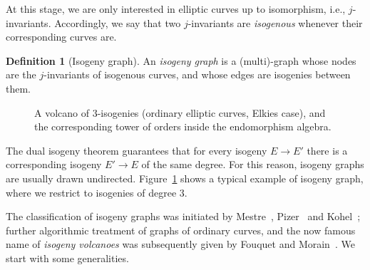 \documentclass[10pt]{article}
\theoremstyle{plain}
\theoremstyle{definition}
\newtheorem{definition}[theorem]{Definition}
\DeclareMathOperator{\End}{End} %
\def\O{\ensuremath{\mathcal{O}}}
\begin{document}
At this stage, we are only interested in elliptic curves up to
isomorphism, i.e., $j$-invariants. %
Accordingly, we say that two $j$-invariants are \emph{isogenous}
whenever their corresponding curves are. %

\begin{definition}[Isogeny graph]
  An \emph{isogeny graph} is a (multi)-graph whose nodes are the
  $j$-invariants of isogenous curves, and whose edges are isogenies
  between them.
\end{definition}


\begin{figure}
  \centering
  
    \caption{A volcano of $3$-isogenies (ordinary elliptic curves,
      Elkies case), and the corresponding tower of orders inside the
      endomorphism algebra.}
  \label{fig:volcano}
\end{figure}

The dual isogeny theorem guarantees that for every isogeny $E\to E'$
there is a corresponding isogeny $E'\to E$ of the same degree. %
For this reason, isogeny graphs are usually drawn undirected. %
Figure~\ref{fig:volcano} shows a typical example of isogeny graph,
where we restrict to isogenies of degree $3$.

The classification of isogeny graphs was initiated by
Mestre~\cite{Mestre}, Pizer~\cite{pizer1,pizer2} and
Kohel~\cite{kohel}; further algorithmic treatment of graphs of
ordinary curves, and the now famous name of \emph{isogeny volcanoes}
was subsequently given by Fouquet and
Morain~\cite{fouquet+morain02}. %
We start with some generalities.
\end{document}
